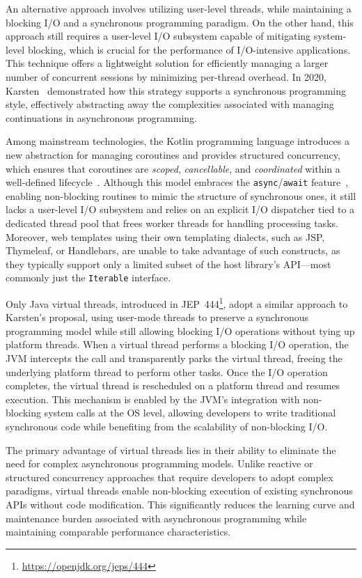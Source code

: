 An alternative approach involves utilizing user-level threads, while
maintaining a blocking I/O and a synchronous programming paradigm. On the other hand,
this approach still requires a user-level I/O subsystem capable of mitigating
system-level blocking, which is crucial for the performance of I/O-intensive
applications. This technique offers a lightweight solution for efficiently
managing a larger number of concurrent sessions by minimizing per-thread
overhead. In 2020, Karsten~\cite{karsten2020} demonstrated how this strategy
supports a synchronous programming style, effectively abstracting away the
complexities associated with managing continuations in asynchronous
programming.

Among mainstream technologies, the Kotlin programming language introduces a new
abstraction for managing coroutines and provides structured concurrency, which
ensures that coroutines are \textit{scoped}, \textit{cancellable}, and
\textit{coordinated} within a well-defined
lifecycle~\cite{elizarov2021coroutines}. Although this model embraces the
\texttt{async}/\texttt{await} feature~\cite{async_await}, enabling non-blocking
routines to mimic the structure of synchronous ones, it still lacks a
user-level I/O subsystem and relies on an explicit I/O dispatcher tied to a
dedicated thread pool that frees worker threads for handling processing tasks.
Moreover, web templates using their own templating dialects, such as JSP,
Thymeleaf, or Handlebars, are unable to take advantage of such constructs, as
they typically support only a limited subset of the host library's API—most
commonly just the \texttt{Iterable} interface.

Only Java virtual threads, introduced in
JEP~444\footnote{\url{https://openjdk.org/jeps/444}}, adopt a similar approach
to Karsten's proposal, using user-mode threads to preserve a synchronous
programming model while still allowing blocking I/O operations without tying up
platform threads. When a virtual thread performs a blocking I/O operation, the
JVM intercepts the call and transparently parks the virtual thread, freeing the
underlying platform thread to perform other tasks. Once the I/O operation
completes, the virtual thread is rescheduled on a platform thread and resumes
execution. This mechanism is enabled by the JVM's integration with non-blocking
system calls at the OS level, allowing developers to write traditional
synchronous code while benefiting from the scalability of non-blocking I/O.

The primary advantage of virtual threads lies in their ability to eliminate the
need for complex asynchronous programming models. Unlike reactive or structured
concurrency approaches that require developers to adopt complex paradigms, virtual
threads enable non-blocking execution of existing synchronous APIs without code
modification. This significantly reduces the learning curve and maintenance
burden associated with asynchronous programming while maintaining comparable
performance characteristics.

